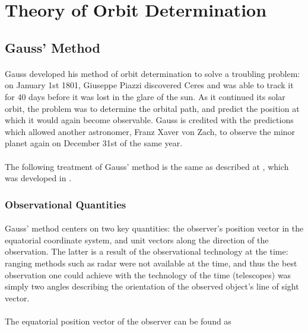 \documentclass[11pt,twoside,letterpaper]{article}
\begin{document}
  
  \section{Theory of Orbit Determination}
  
  \subsection {Gauss' Method}
    
  \paragraph{}
  Gauss developed his method of orbit determination to solve a
  troubling problem: on January 1st 1801, Giuseppe Piazzi discovered
  Ceres and was able to track it for 40 days before it was lost in the
  glare of the sun. As it continued its solar orbit, the problem was
  to determine the orbital path, and predict the position at which it
  would again become observable. Gauss is credited with the
  predictions which allowed another astronomer, Franz Xaver von Zach,
  to observe the minor planet again on December 31st of the same year.

  \paragraph{}
  The following treatment of Gauss' method is the same as described at
  \cite{Wikipedia_2018}, which was developed in \cite{curtis_2014}.

  \subsubsection {Observational Quantities}
  \paragraph{}
  Gauss' method centers on two key quantities: the observer's position
  vector in the equatorial coordinate system, and unit vectors along
  the direction of the observation. The latter is a result of the
  observational technology at the time: ranging methods such as radar
  were not available at the time, and thus the best observation one
  could achieve with the technology of the time (telescopes) was
  simply two angles describing the orientation of the observed
  object's line of sight vector. 

  \paragraph{}
  The equatorial position vector of the observer can be found as
 
\end{document}
